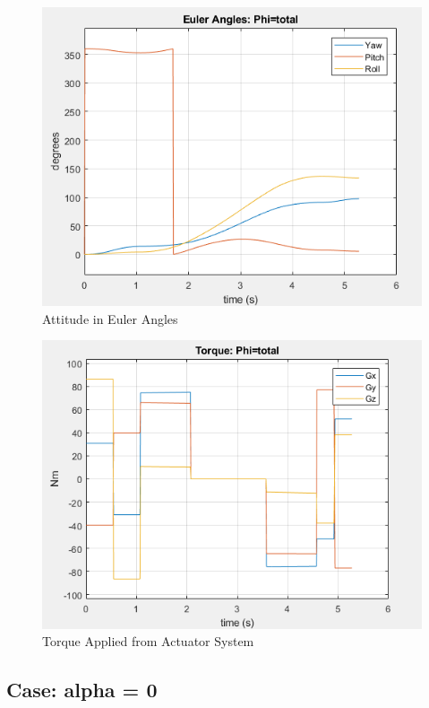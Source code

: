 \documentclass[letterpaper, preprint, paper,11pt]{AAS}	%
\begin{document}
			\begin{figure}[H]
				\label{fig:euler_ang_phi_total}
				\begin{center}
				\includegraphics[width=4.5in]{figures/alphaNot0/euler_ang_phi_total.png}
				\end{center}
				\caption{Attitude in Euler Angles}
			\end{figure}
		
			\begin{figure}[H]
				\label{fig:torque_total}
				\begin{center}
				\includegraphics[width=4.5in]{figures/alphaNot0/torque_total.png}
				\end{center}
				\caption{Torque Applied from Actuator System}
			\end{figure}
			
			
			
			\subsection{Case: alpha = 0} 
			
\end{document}
